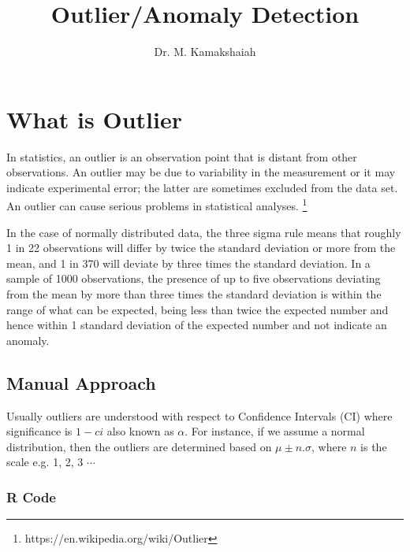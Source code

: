 \documentclass{article}
\title{Outlier/Anomaly Detection}
\author{Dr. M. Kamakshaiah}
\begin{document}

\maketitle 
\newpage
\tableofcontents
\newpage
\section{What is Outlier}

In statistics, an outlier is an observation point that is distant from other observations. An outlier may be due to variability in the measurement or it may indicate experimental error; the latter are sometimes excluded from the data set. An outlier can cause serious problems in statistical analyses. \footnote{https://en.wikipedia.org/wiki/Outlier}

In the case of normally distributed data, the three sigma rule means that roughly 1 in 22 observations will differ by twice the standard deviation or more from the mean, and 1 in 370 will deviate by three times the standard deviation. In a sample of 1000 observations, the presence of up to five observations deviating from the mean by more than three times the standard deviation is within the range of what can be expected, being less than twice the expected number and hence within 1 standard deviation of the expected number and not indicate an anomaly. 

\subsection{Manual Approach}

Usually outliers are understood with respect to Confidence Intervals (CI) where significance is $1-ci$ also known as $\alpha$. For instance, if we assume a normal distribution, then the outliers are determined based on $\mu \pm n.\sigma$, where $n$ is the scale e.g. 1, 2, 3 $\cdots$   

\subsubsection{R Code}
\end{document}
